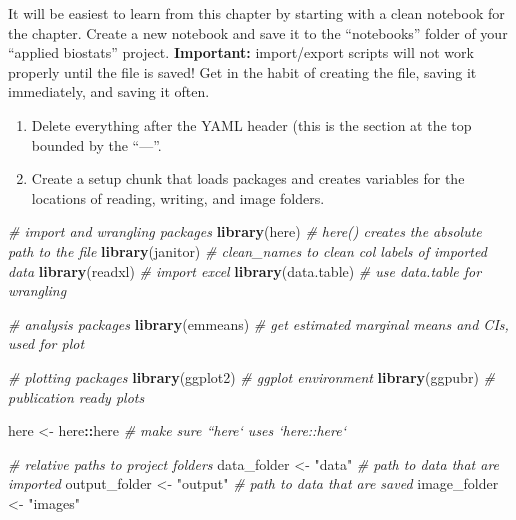 \documentclass[]{book}
\newenvironment{Shaded}{\begin{snugshade}}{\end{snugshade}}
\newcommand{\CommentTok}[1]{\textcolor[rgb]{0.56,0.35,0.01}{\textit{#1}}}
\newcommand{\KeywordTok}[1]{\textcolor[rgb]{0.13,0.29,0.53}{\textbf{#1}}}
\newcommand{\NormalTok}[1]{#1}
\newcommand{\OperatorTok}[1]{\textcolor[rgb]{0.81,0.36,0.00}{\textbf{#1}}}
\newcommand{\StringTok}[1]{\textcolor[rgb]{0.31,0.60,0.02}{#1}}
\providecommand{\tightlist}{%
  \setlength{\itemsep}{0pt}\setlength{\parskip}{0pt}}
\begin{document}
It will be easiest to learn from this chapter by starting with a clean notebook for the chapter. Create a new notebook and save it to the ``notebooks'' folder of your ``applied biostats'' project. \textbf{Important:} import/export scripts will not work properly until the file is saved! Get in the habit of creating the file, saving it immediately, and saving it often.

\begin{enumerate}
\def\labelenumi{\arabic{enumi}.}
\tightlist
\item
  Delete everything after the YAML header (this is the section at the top bounded by the ``---''.
\item
  Create a setup chunk that loads packages and creates variables for the locations of reading, writing, and image folders.
\end{enumerate}

\begin{Shaded}
\begin{Highlighting}[]
\CommentTok{# import and wrangling packages}
\KeywordTok{library}\NormalTok{(here) }\CommentTok{# here() creates the absolute path to the file}
\KeywordTok{library}\NormalTok{(janitor) }\CommentTok{# clean_names to clean col labels of imported data}
\KeywordTok{library}\NormalTok{(readxl) }\CommentTok{# import excel}
\KeywordTok{library}\NormalTok{(data.table) }\CommentTok{# use data.table for wrangling}

\CommentTok{# analysis packages}
\KeywordTok{library}\NormalTok{(emmeans) }\CommentTok{# get estimated marginal means and CIs, used for plot}

\CommentTok{# plotting packages}
\KeywordTok{library}\NormalTok{(ggplot2) }\CommentTok{# ggplot environment}
\KeywordTok{library}\NormalTok{(ggpubr) }\CommentTok{# publication ready plots}

\NormalTok{here <-}\StringTok{ }\NormalTok{here}\OperatorTok{::}\NormalTok{here }\CommentTok{# make sure ``here` uses `here::here`}

\CommentTok{# relative paths to project folders}
\NormalTok{data_folder <-}\StringTok{ "data"} \CommentTok{# path to data that are imported}
\NormalTok{output_folder <-}\StringTok{ "output"} \CommentTok{# path to data that are saved}
\NormalTok{image_folder <-}\StringTok{ "images"}
\end{Highlighting}
\end{Shaded}
\end{document}
